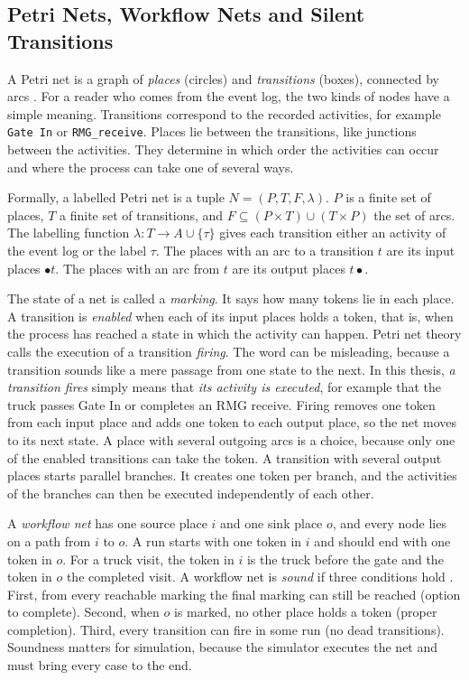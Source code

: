 \subsection{Petri Nets, Workflow Nets and Silent Transitions}
\label{sec:bg_petri}

A Petri net is a graph of \emph{places} (circles) and \emph{transitions}
(boxes), connected by arcs \cite{Aalst2016}. For a reader who comes from the
event log, the two kinds of nodes have a simple meaning. Transitions correspond
to the recorded activities, for example \texttt{Gate In} or
\texttt{RMG\_receive}. Places lie between the transitions, like junctions
between the activities. They determine in which order the activities can occur
and where the process can take one of several ways.

Formally, a labelled Petri net is a tuple $N=(P,T,F,\lambda)$. $P$ is a finite
set of places, $T$ a finite set of transitions, and
$F\subseteq(P\times T)\cup(T\times P)$ the set of arcs. The labelling function
$\lambda: T\rightarrow A\cup\{\tau\}$ gives each transition either an activity
of the event log or the label $\tau$. The places with an arc to a transition
$t$ are its input places ${\bullet}t$. The places with an arc from $t$ are its
output places $t{\bullet}$.

The state of a net is called a \emph{marking}. It says how many tokens lie in
each place. A transition is \emph{enabled} when each of its input places holds
a token, that is, when the process has reached a state in which the activity can
happen. Petri net theory calls the execution of a transition \emph{firing}. The
word can be misleading, because a transition sounds like a mere passage from one
state to the next. In this thesis, \emph{a transition fires} simply means that
\emph{its activity is executed}, for example that the truck passes Gate In or
completes an RMG receive. Firing removes one token from each input place and adds
one token to each output place, so the net moves to its next state. A place with
several outgoing arcs is a choice, because only one of the enabled transitions
can take the token. A transition with several output places starts parallel
branches. It creates one token per branch, and the activities of the branches
can then be executed independently of each other.

A \emph{workflow net} has one source place $i$ and one sink place $o$, and
every node lies on a path from $i$ to $o$. A run starts with one token in $i$
and should end with one token in $o$. For a truck visit, the token in $i$ is the
truck before the gate and the token in $o$ the completed visit. A workflow net
is \emph{sound} if three conditions hold \cite{Aalst2016}. First, from
every reachable marking the final marking can still be reached (option to
complete). Second, when $o$ is marked, no other place holds a token (proper
completion). Third, every transition can fire in some run (no dead
transitions). Soundness matters for simulation, because the simulator executes
the net and must bring every case to the end.


